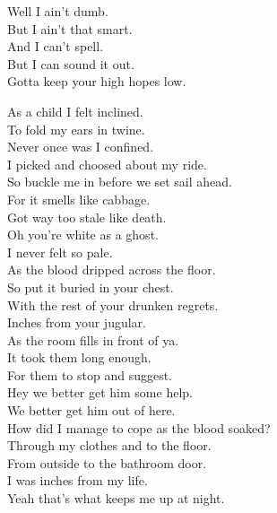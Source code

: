 


Well I ain't dumb. \\
But I ain't that smart. \\
And I can't spell. \\
But I can sound it out. \\

Gotta keep your high hopes low. \\




As a child I felt inclined. \\
To fold my ears in twine. \\
Never once was I confined. \\
I picked and choosed about my ride. \\
So buckle me in before we set sail ahead. \\
For it smells like cabbage. \\
Got way too stale like death. \\

Oh you're white as a ghost. \\
I never felt so pale. \\
As the blood dripped across the floor. \\

So put it buried in your chest. \\
With the rest of your drunken regrets. \\
Inches from your jugular. \\
As the room fills in front of ya. \\
It took them long enough. \\
For them to stop and suggest. \\
Hey we better get him some help. \\
We better get him out of here. \\

How did I manage to cope as the blood soaked? \\
Through my clothes and to the floor. \\
From outside to the bathroom door. \\
I was inches from my life. \\
Yeah that's what keeps me up at night. \\

